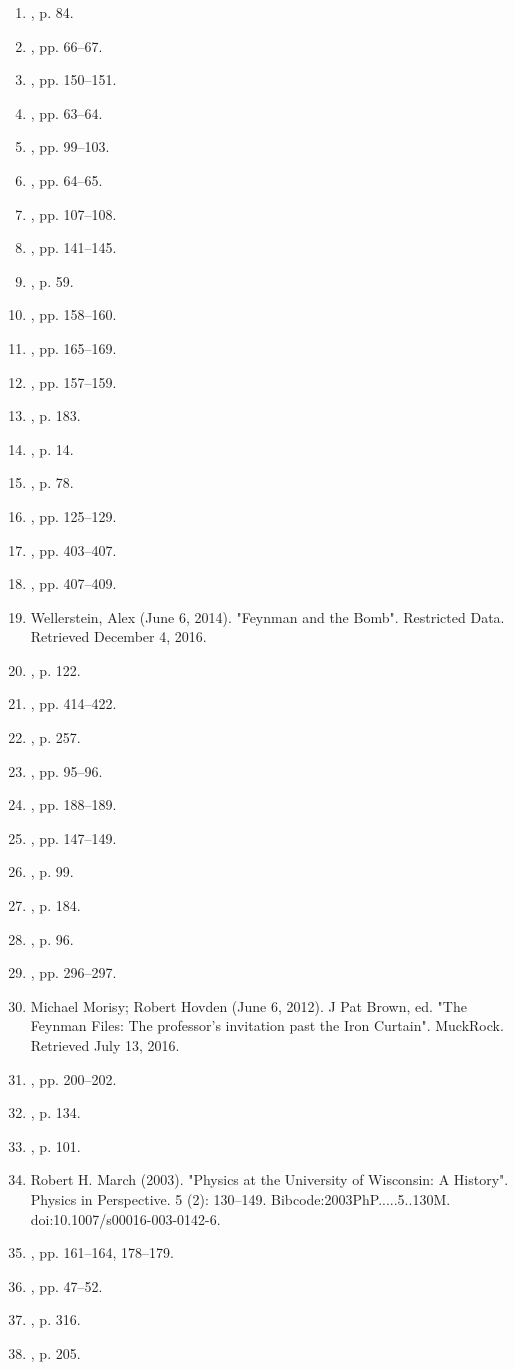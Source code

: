 \begin{enumerate}
\item , p. 84.
\item , pp. 66–67.
\item , pp. 150–151.
\item , pp. 63–64.
\item , pp. 99–103.
\item , pp. 64–65.
\item , pp. 107–108.
\item , pp. 141–145.
\item , p. 59.
\item , pp. 158–160.
\item , pp. 165–169.
\item , pp. 157–159.
\item , p. 183.
\item , p. 14.
\item , p. 78.
\item , pp. 125–129.
\item , pp. 403–407.
\item , pp. 407–409.
\item Wellerstein, Alex (June 6, 2014). "Feynman and the Bomb". Restricted Data. Retrieved December 4, 2016.
\item , p. 122.
\item , pp. 414–422.
\item , p. 257.
\item , pp. 95–96.
\item , pp. 188–189.
\item , pp. 147–149.
\item , p. 99.
\item , p. 184.
\item , p. 96.
\item , pp. 296–297.
\item Michael Morisy; Robert Hovden (June 6, 2012). J Pat Brown, ed. "The Feynman Files: The professor's invitation past the Iron Curtain". MuckRock. Retrieved July 13, 2016.
\item , pp. 200–202.
\item , p. 134.
\item , p. 101.
\item Robert H. March (2003). "Physics at the University of Wisconsin: A History". Physics in Perspective. 5 (2): 130–149. Bibcode:2003PhP.....5..130M. doi:10.1007/s00016-003-0142-6.
\item , pp. 161–164, 178–179.
\item , pp. 47–52.
\item , p. 316.
\item , p. 205.

\end{enumerate}
